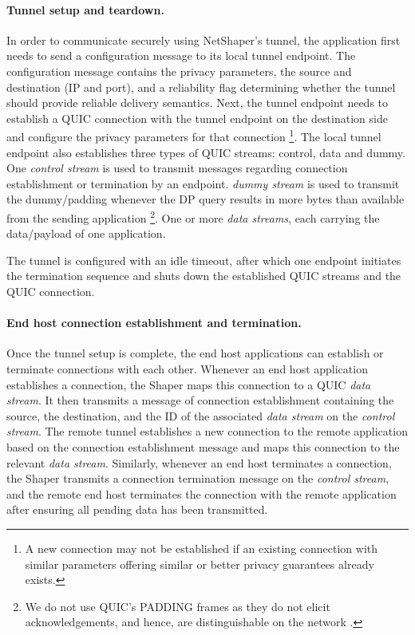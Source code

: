 \paragraph{Tunnel setup and teardown.}
In order to communicate securely using NetShaper's tunnel, the application first needs to send a configuration message to its local tunnel endpoint.
The configuration message contains the privacy parameters, the source and destination (IP and port), and a reliability flag determining whether the tunnel should provide reliable delivery semantics.
Next, the tunnel endpoint needs to establish a QUIC connection with the tunnel endpoint on the destination side and configure the privacy parameters for that connection
\footnote{A new connection may not be established if an existing connection with similar parameters offering similar or better privacy guarantees already exists.}.
The local tunnel endpoint also establishes three types of QUIC streams: control, data and dummy.
One \textit{control stream} is used to transmit messages regarding connection establishment or termination by an endpoint.
\textit{dummy stream} is used to transmit the dummy/padding whenever the DP query results in more bytes than available from the sending application
\footnote{We do not use QUIC's PADDING frames as they do not elicit acknowledgements, and hence, are distinguishable on the network \cite{quic_rfc}.}.
One or more \textit{data streams}, each carrying the data/payload of one application.

The tunnel is configured with an idle timeout, after which one endpoint initiates the termination sequence and shuts down the established QUIC streams and the QUIC connection.

\paragraph{End host connection establishment and termination.}
Once the tunnel setup is complete, the end host applications can establish or terminate connections with each other.
Whenever an end host application establishes a connection, the Shaper maps this connection to a QUIC \textit{data stream}.
It then transmits a message of connection establishment containing the source, the destination, and the ID of the associated \textit{data stream} on the \textit{control stream}.
The remote tunnel establishes a new connection to the remote application based on the connection establishment message and maps this connection to the relevant \textit{data stream}.
Similarly, whenever an end host terminates a connection, the Shaper transmits a connection termination message on the \textit{control stream}, and the remote end host terminates the connection with the remote application after ensuring all pending data has been transmitted.

